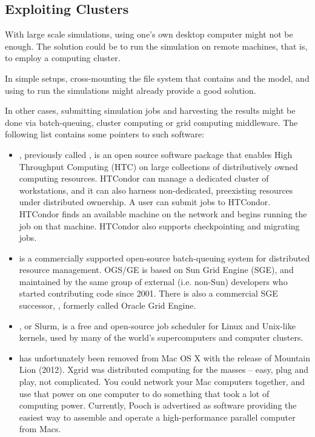 \subsection{Exploiting Clusters}
\label{sec:run-sim:opp-runall:exploiting-clusters}

With large scale simulations, using one's own desktop computer might not be
enough. The solution could be to run the simulation on remote machines,
that is, to employ a computing cluster.

In simple setups, cross-mounting the file system that contains {\opp} and the
model, and using  to run the simulations might already provide a good
solution.

In other cases, submitting simulation jobs and harvesting the results might be
done via batch-queuing, cluster computing or grid computing middleware. The
following list contains some pointers to such software:

\begin{itemize}

  \item {}, previously called , is an open source
      software package that enables High Throughput Computing (HTC)
      on large collections of distributively owned computing resources.
      HTCondor can manage a dedicated cluster of workstations, and it can also
      harness non-dedicated, preexisting resources under distributed ownership.
      A user can submit jobs to HTCondor. HTCondor finds an available machine
      on the network and begins running the job on that machine. HTCondor also
      supports checkpointing and migrating jobs.

\item {} is a commercially supported
      open-source batch-queuing system for distributed resource management.
      OGS/GE is based on Sun Grid Engine (SGE), and maintained by the same group
      of external (i.e. non-Sun) developers who started contributing code since
      2001. There is also a commercial SGE successor, ,
      formerly called Oracle Grid Engine.

\item {}, or Slurm, is a free and open-source job
      scheduler for Linux and Unix-like kernels, used by many of the world's
      supercomputers and computer clusters.

\item {} has unfortunately been removed from Mac OS X with the
     release of Mountain Lion (2012). Xgrid was distributed computing for
     the masses -- easy, plug and play, not complicated. You could network your
     Mac computers together, and use that power on one computer to do something
     that took a lot of computing power. Currently, Pooch is advertised
     as software providing the easiest way to assemble and operate a
     high-performance parallel computer from Macs.

\end{itemize}



